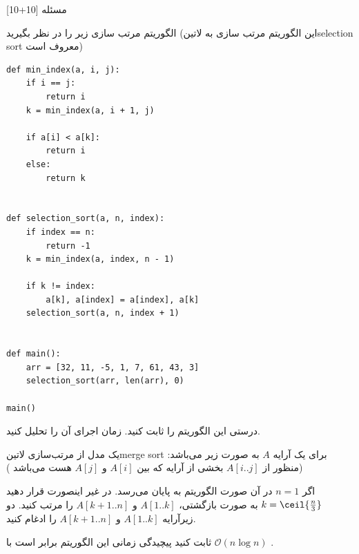 ‌مسئله [10+10]


 الگوریتم مرتب سازی زیر را  در نظر بگیرید (این الگوریتم مرتب سازی به ‌لاتین{selection sort} معروف است)

\begin{latin}
\begin{lstlisting}
def min_index(a, i, j):
	if i == j:
		return i
	k = min_index(a, i + 1, j)

	if a[i] < a[k]:
		return i
	else:
		return k


def selection_sort(a, n, index):
	if index == n:
		return -1
	k = min_index(a, index, n - 1)

	if k != index:
		a[k], a[index] = a[index], a[k]
	selection_sort(a, n, index + 1)


def main():
	arr = [32, 11, -5, 1, 7, 61, 43, 3]
	selection_sort(arr, len(arr), 0)
	
main()
\end{lstlisting}
\end{latin}


 درستی این الگوریتم را ثابت کنید.
 زمان اجرای آن را تحلیل کنید.



یک مدل از مرتب‌سازی ‌لاتین{merge sort} برای یک آرایه $A$ به صورت زیر می‌باشد:(منظور از 
$A[i..j]$
بخشی از آرایه که بین 
$A[i]$
و
$A[j]$
هست می‌باشد
)

 اگر 
$n=1$
در آن صورت الگوریتم به پایان می‌رسد.
 در غیر اینصورت قرار دهید
$k=\ceil{\frac{n}{3}}$
 به صورت بازگشتی، 
$A[1..k]$
و
$A[k+1..n]$
را مرتب کنید.
 دو زیرآرایه 
$A[1..k]$
و
$A[k+1..n]$
را ادغام کنید.


ثابت کنید پیچیدگی زمانی این الگوریتم برابر است با 
$\mathcal{O}(n\log{}n)$
.


